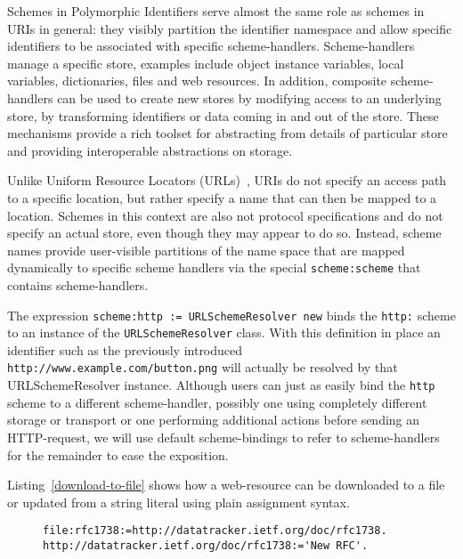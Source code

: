 \documentclass[preprint]{sigplanconf}
\begin{document}
Schemes in Polymorphic Identifiers serve almost the same role as schemes in URIs
in general:  they visibly partition the identifier namespace and allow specific identifiers
to be associated with specific scheme-handlers.  Scheme-handlers manage a specific
store, examples include object instance variables, local variables, dictionaries, files
and web resources.  In addition, composite scheme-handlers can be used to 
create new stores by modifying access to an underlying store, by transforming 
identifiers or data coming in and out of the store.  These mechanisms provide
a rich toolset for abstracting from details of particular store and providing interoperable
abstractions on storage.

Unlike Uniform Resource Locators (URLs)~\cite{rfc1738}, URIs do not specify an access
path to a specific location, but rather specify a name that can then be mapped to a location.
Schemes in this context are also not protocol specifications and do not specify an actual store,
even though they may appear to do so.  Instead, scheme names provide user-visible
partitions of the name space that are mapped dynamically to specific scheme handlers
via the special {\tt scheme:scheme} that contains scheme-handlers.

The expression {\tt scheme:http := URLSchemeResolver new}
binds the {\tt http:} scheme to an instance of the {\tt URLSchemeResolver} class. With this
definition in place an identifier such as the previously introduced {\tt http://www.example.com/button.png} will actually be
resolved by that URLSchemeResolver instance.  Although users can just as easily bind 
the {\tt http} scheme to a different scheme-handler, possibly one using completely different
storage or transport or one performing additional actions before sending an HTTP-request,
we will use default scheme-bindings to refer to scheme-handlers for the remainder 
to ease the exposition.

Listing~\ref{download-to-file} shows how a web-resource can be downloaded to a file
or updated from a string literal using plain assignment syntax.  

\begin{figure}[htbp]
\begin{lstlisting}[style=numbers,label=download-to-file,caption=Downloading an RFC to a file.]
file:rfc1738:=http://datatracker.ietf.org/doc/rfc1738.
http://datatracker.ietf.org/doc/rfc1738:='New RFC'.
\end{lstlisting}
\end{figure}
\end{document}

